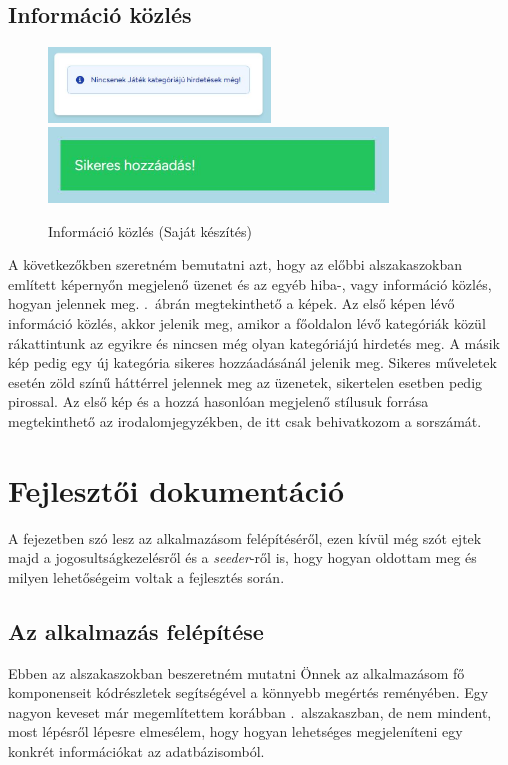 \documentclass[]{thesis-ekf}
\theoremstyle{definition}
\theoremstyle{remark}
\begin{document}
	\section{Információ közlés}
		\begin{figure}[ht!]
			\centering
			\includegraphics[height=2cm]{./felhasznaloi/kategoriaUzenet}
			\includegraphics[height=2cm]{./felhasznaloi/kategoria2}
			\caption{Információ közlés (Saját készítés)} 
			\label{informaciokozles}
		\end{figure}
		A következőkben szeretném bemutatni azt, hogy az előbbi alszakaszokban említett képernyőn megjelenő üzenet és az egyéb hiba-, vagy információ közlés, hogyan jelennek meg. .~ábrán megtekinthető a képek. Az első képen lévő információ közlés, akkor jelenik meg, amikor a főoldalon lévő kategóriák közül rákattintunk az egyikre és nincsen még olyan kategóriájú hirdetés meg. A másik kép pedig egy új kategória sikeres hozzáadásánál jelenik meg. Sikeres műveletek esetén zöld színű háttérrel jelennek meg az üzenetek, sikertelen esetben pedig pirossal. Az első kép és a hozzá hasonlóan megjelenő stílusuk forrása megtekinthető az irodalomjegyzékben, de itt csak behivatkozom a sorszámát. \cite{FlowBite}
	
	\chapter{Fejlesztői dokumentáció}
		A fejezetben szó lesz az alkalmazásom felépítéséről, ezen kívül még szót ejtek majd a jogosultságkezelésről és a \emph{seeder}-ről is, hogy hogyan oldottam meg és milyen lehetőségeim voltak a fejlesztés során.
	\section{Az alkalmazás felépítése}
		Ebben az alszakaszokban beszeretném mutatni Önnek az alkalmazásom fő komponenseit kódrészletek segítségével a könnyebb megértés reményében. Egy nagyon keveset már megemlítettem korábban .~alszakaszban, de nem mindent, most lépésről lépesre elmesélem, hogy hogyan lehetséges megjeleníteni egy konkrét információkat az adatbázisomból.
\end{document}
